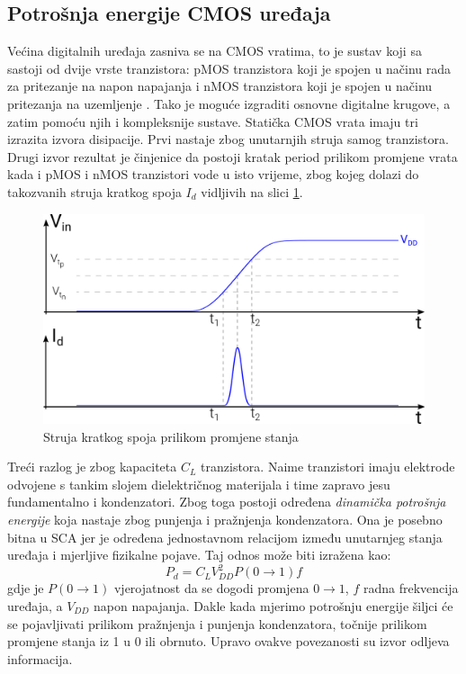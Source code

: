 \documentclass[times, utf8, diplomski]{fer}
\begin{document}
\subsection{Potrošnja energije CMOS uređaja} \label{sec:power_cmos}

Većina digitalnih uređaja zasniva se na CMOS vratima, to je sustav koji sa sastoji od dvije vrste tranzistora: pMOS tranzistora koji je spojen u načinu rada za pritezanje na napon napajanja  i nMOS tranzistora koji je spojen u načinu pritezanja na uzemljenje . Tako je moguće izgraditi osnovne digitalne krugove, a zatim pomoću njih i kompleksnije sustave. Statička CMOS vrata imaju tri izrazita izvora disipacije. Prvi nastaje zbog unutarnjih struja samog tranzistora. Drugi izvor rezultat je činjenice da postoji kratak period prilikom promjene vrata kada i pMOS i nMOS tranzistori vode u isto vrijeme, zbog kojeg dolazi do takozvanih struja kratkog spoja \(I_d\) vidljivih na slici \ref{fig:short_circuit_current}.

\begin{figure}[htb]
    \centering
    \includegraphics[width=12cm]{resources/images/SCA/short_circuit_current.png}
    \caption{Struja kratkog spoja prilikom promjene stanja}
    \label{fig:short_circuit_current}
\end{figure}

Treći razlog je zbog kapaciteta \(C_L\) tranzistora. Naime tranzistori imaju elektrode odvojene s tankim slojem dielektričnog materijala i time zapravo jesu fundamentalno i kondenzatori. Zbog toga postoji određena \emph{dinamička potrošnja energije} koja nastaje zbog punjenja i pražnjenja kondenzatora. Ona je posebno bitna u SCA jer je određena jednostavnom relacijom između unutarnjeg stanja uređaja i mjerljive fizikalne pojave. Taj odnos može biti izražena kao:
\begin{equation}
    P_d = C_L V_{DD}^2 P(0 \rightarrow 1) f
\end{equation}
gdje je \(P(0 \rightarrow 1)\) vjerojatnost da se dogodi promjena \(0 \rightarrow 1\), \(f\) radna frekvencija uređaja, a \(V_{DD}\) napon napajanja. Dakle kada mjerimo potrošnju energije šiljci će se pojavljivati prilikom pražnjenja i punjenja kondenzatora, točnije prilikom promjene stanja iz 1 u 0 ili obrnuto. Upravo ovakve povezanosti su izvor odljeva informacija.
\end{document}
